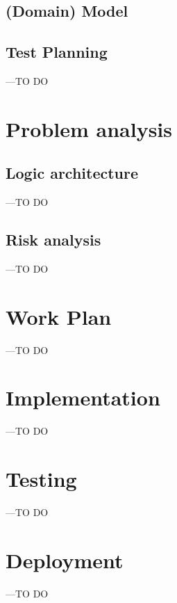 \documentclass[a4paper]{article}
\begin{document}
\subsection {(Domain) Model }

\subsection {Test Planning}
---TO DO
\section{Problem analysis }

\subsection{Logic architecture}
---TO DO

\subsection{Risk analysis}
---TO DO
\section{Work Plan}
---TO DO

\section{Implementation}
---TO DO
\section{Testing}
---TO DO
\section{Deployment}
---TO DO


\end{document}
